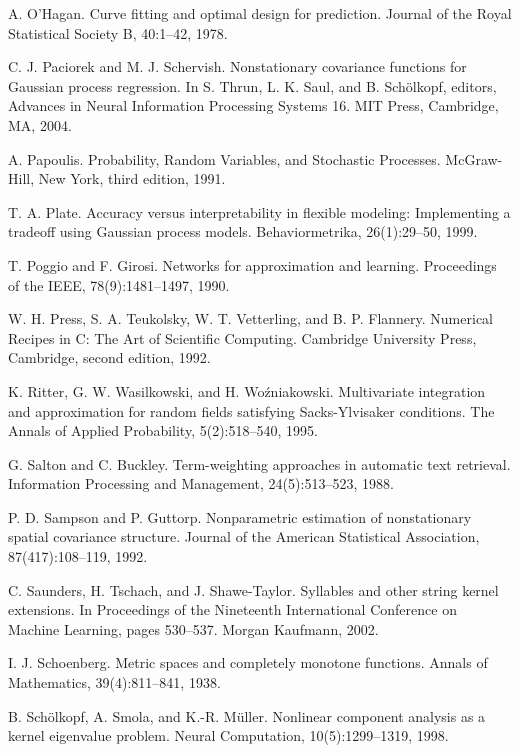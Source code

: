 \documentclass[11pt]{book}
\begin{document}
\begin{thebibliography}{99}
 A. O'Hagan. Curve fitting and optimal design for prediction. Journal of the Royal Statistical Society B, 40:1--42, 1978.

 C. J. Paciorek and M. J. Schervish. Nonstationary covariance functions for Gaussian process regression. In S. Thrun, L. K. Saul, and B. Schölkopf, editors, Advances in Neural Information Processing Systems 16. MIT Press, Cambridge, MA, 2004.

 A. Papoulis. Probability, Random Variables, and Stochastic Processes. McGraw-Hill, New York, third edition, 1991.

 T. A. Plate. Accuracy versus interpretability in flexible modeling: Implementing a tradeoff using Gaussian process models. Behaviormetrika, 26(1):29--50, 1999.

 T. Poggio and F. Girosi. Networks for approximation and learning. Proceedings of the IEEE, 78(9):1481--1497, 1990.

 W. H. Press, S. A. Teukolsky, W. T. Vetterling, and B. P. Flannery. Numerical Recipes in C: The Art of Scientific Computing. Cambridge University Press, Cambridge, second edition, 1992.

 K. Ritter, G. W. Wasilkowski, and H. Woźniakowski. Multivariate integration and approximation for random fields satisfying Sacks-Ylvisaker conditions. The Annals of Applied Probability, 5(2):518--540, 1995.

 G. Salton and C. Buckley. Term-weighting approaches in automatic text retrieval. Information Processing and Management, 24(5):513--523, 1988.

 P. D. Sampson and P. Guttorp. Nonparametric estimation of nonstationary spatial covariance structure. Journal of the American Statistical Association, 87(417):108--119, 1992.

 C. Saunders, H. Tschach, and J. Shawe-Taylor. Syllables and other string kernel extensions. In Proceedings of the Nineteenth International Conference on Machine Learning, pages 530--537. Morgan Kaufmann, 2002.

 I. J. Schoenberg. Metric spaces and completely monotone functions. Annals of Mathematics, 39(4):811--841, 1938.

 B. Schölkopf, A. Smola, and K.-R. Müller. Nonlinear component analysis as a kernel eigenvalue problem. Neural Computation, 10(5):1299--1319, 1998.


\end{thebibliography}
\end{document}
